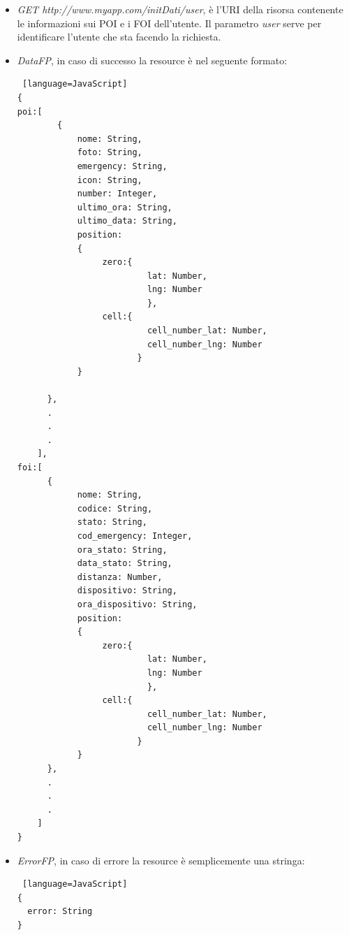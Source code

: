 \begin{itemize}
\item \textit{GET http://www.myapp.com/initDati/user}, è l'URI della risorsa contenente le informazioni sui POI e i FOI dell'utente. Il parametro \textit{user} serve per identificare l'utente che sta facendo la richiesta.
\item \textit{DataFP}, in caso di successo la resource è nel seguente formato:\\
\begin{lstlisting} [language=JavaScript]
{
poi:[
		{
			nome: String,
			foto: String,
			emergency: String,
			icon: String,
			number: Integer,
			ultimo_ora: String,
			ultimo_data: String,
			position: 
			{
			     zero:{
			              lat: Number,
			              lng: Number
			              },
			     cell:{
			              cell_number_lat: Number,
			              cell_number_lng: Number
			            }
			}
			
	  },
	  .
	  .
	  .
	],
foi:[
	  {
			nome: String,
			codice: String,
			stato: String,
			cod_emergency: Integer,
			ora_stato: String,
			data_stato: String,
			distanza: Number,
			dispositivo: String,
			ora_dispositivo: String,
			position: 
			{
			     zero:{
			              lat: Number,
			              lng: Number
			              },
			     cell:{
			              cell_number_lat: Number,
			              cell_number_lng: Number
			            }
			}
	  },
	  .
	  .
	  .
	]
}
\end{lstlisting}
\item \textit{ErrorFP}, in caso di errore la resource è semplicemente una stringa:\\
\begin{lstlisting} [language=JavaScript]
{
  error: String
}
\end{lstlisting}
\end{itemize}


